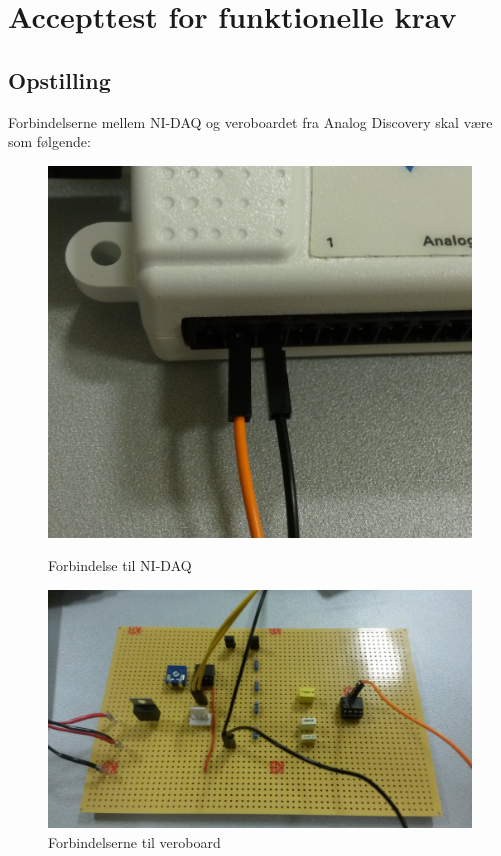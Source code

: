 \section{Accepttest for funktionelle krav}
\subsection{Opstilling}
Forbindelserne mellem NI-DAQ og veroboardet fra Analog Discovery skal være som følgende:
\begin{figure}[htb]
  \begin{minipage}{0.35\textwidth}
    \centering
      \includegraphics[width=\textwidth]{billeder/ATopstilling_conn}
      \caption{Forbindelse til NI-DAQ}
    \label{fig:figur3}
  \end{minipage}
  \hspace{0.1\textwidth}
  \begin{minipage}{0.55\textwidth}
    \centering
      \includegraphics[width=\textwidth]{billeder/ATopstilling_board}
      \caption{Forbindelserne til veroboard}
    \label{fig:figur4}
  \end{minipage}
\end{figure}
